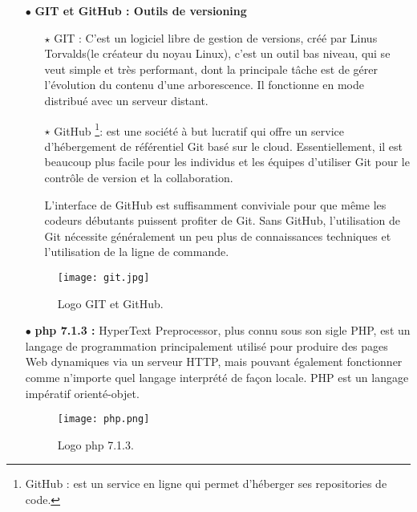 \begin{itemize}
\medskip	



\item[$\bullet$] \textbf{ GIT et GitHub : Outils de versioning}

	\begin{itemize}	
	\item[$\star$] GIT :  C'est un logiciel libre de gestion de versions, créé par Linus Torvalds(le créateur du noyau Linux), c’est un outil bas niveau, qui se veut simple et très performant, dont la principale tâche est de gérer l’évolution du contenu d’une arborescence. Il fonctionne en mode distribué avec un serveur distant\cite{wiki:git}.
	\item[$\star$] GitHub \footnote{GitHub : est un service en ligne qui permet d'héberger ses repositories de code.}: est une société à but lucratif qui offre un service d’hébergement de référentiel Git basé sur le cloud. Essentiellement, il est beaucoup plus facile pour les individus et les équipes d’utiliser Git pour le contrôle de version et la collaboration.
	
	L’interface de GitHub est suffisamment conviviale pour que même les codeurs débutants puissent profiter de Git. Sans GitHub, l’utilisation de Git nécessite généralement un peu plus de connaissances techniques et l’utilisation de la ligne de commande.

\end{itemize}



\begin{figure}[ht]
	\centering
	\texttt{[image: git.jpg]}
	\caption{Logo GIT et GitHub.}
	\label{fig:GIT et GitHub }
\end{figure}
\FloatBarrier

\medskip




	\item[$\bullet$] \textbf{ php 7.1.3 :} 
HyperText Preprocessor, plus connu sous
son sigle PHP, est un langage de programmation
principalement utilisé pour produire des pages Web
dynamiques via un serveur HTTP, mais pouvant
également fonctionner comme n'importe quel
langage interprété de façon locale. PHP est un
langage impératif orienté-objet.\cite{wiki:PHP}
\begin{figure}[ht]
	\centering
	\texttt{[image: php.png]}
	\caption{Logo php 7.1.3.}
	\label{fig:Logo php }
\end{figure}
\FloatBarrier






\end{itemize}
